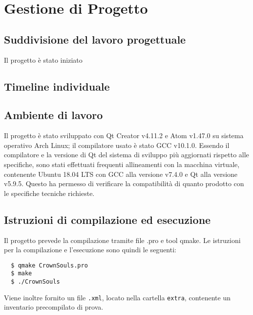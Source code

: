 \section{Gestione di Progetto}

\subsection{Suddivisione del lavoro progettuale}
Il progetto è stato iniziato

\subsection{Timeline individuale}

\subsection{Ambiente di lavoro}
Il progetto è stato sviluppato con Qt Creator v4.11.2 e Atom v1.47.0 su sistema operativo Arch Linux; il compilatore usato è stato GCC v10.1.0. Essendo il compilatore e la versione di Qt del sistema di sviluppo più aggiornati rispetto alle specifiche, sono stati effettuati frequenti allineamenti con la macchina virtuale, contenente Ubuntu 18.04 LTS con GCC alla versione v7.4.0 e Qt alla versione v5.9.5. Questo ha permesso di verificare la compatibilità di quanto prodotto con le specifiche tecniche richieste.

\subsection{Istruzioni di compilazione ed esecuzione}
Il progetto prevede la compilazione tramite file .pro e tool qmake. Le istruzioni per la compilazione e l'esecuzione sono quindi le seguenti:
\begin{center}
\centering
\begin{verbatim}
  $ qmake CrownSouls.pro
  $ make
  $ ./CrownSouls
\end{verbatim}
\end{center}

Viene inoltre fornito un file \texttt{.xml}, locato nella cartella \texttt{extra}, contenente un inventario precompilato di prova.
